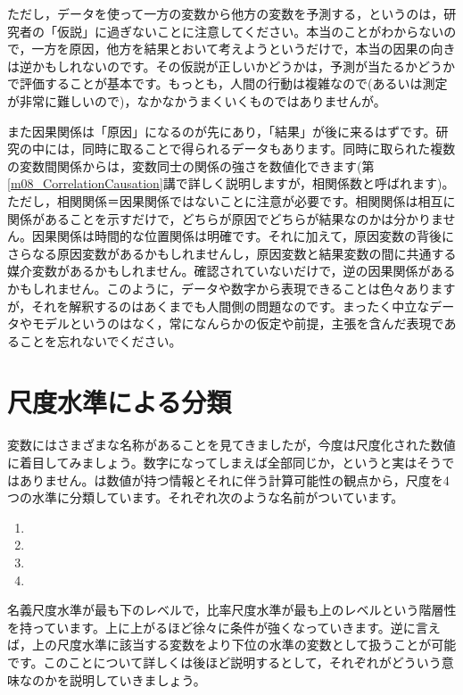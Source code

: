 \documentclass{ltjsbook}
\begin{document}
ただし，データを使って一方の変数から他方の変数を予測する，というのは，研究者の「仮説」に過ぎないことに注意してください。本当のことがわからないので，一方を原因，他方を結果とおいて考えようというだけで，本当の因果の向きは逆かもしれないのです。その仮説が正しいかどうかは，予測が当たるかどうかで評価することが基本です。もっとも，人間の行動は複雑なので(あるいは測定が非常に難しいので)，なかなかうまくいくものではありませんが。

また因果関係は「原因」になるのが先にあり，「結果」が後に来るはずです。研究の中には，同時に取ることで得られるデータもあります。同時に取られた複数の変数間関係からは，変数同士の関係の強さを数値化できます(第\ref{m08_CorrelationCausation}講で詳しく説明しますが，相関係数と呼ばれます)。ただし，相関関係＝因果関係ではないことに注意が必要です。相関関係は相互に関係があることを示すだけで，どちらが原因でどちらが結果なのかは分かりません。因果関係は時間的な位置関係は明確です。それに加えて，原因変数の背後にさらなる原因変数があるかもしれませんし，原因変数と結果変数の間に共通する媒介変数があるかもしれません。確認されていないだけで，逆の因果関係があるかもしれません。このように，データや数字から表現できることは色々ありますが，それを解釈するのはあくまでも人間側の問題なのです。まったく中立なデータやモデルというのはなく，常になんらかの仮定や前提，主張を含んだ表現であることを忘れないでください。


\section{尺度水準による分類}

変数にはさまざまな名称があることを見てきましたが，今度は尺度化された数値に着目してみましょう。数字になってしまえば全部同じか，というと実はそうではありません。\textcite{stevens1946}は数値が持つ情報とそれに伴う計算可能性の観点から，尺度を4つの水準に分類しています。それぞれ次のような名前がついています。
\begin{enumerate}
	\item {}
	\item {}
	\item {}
	\item {}
\end{enumerate}

名義尺度水準が最も下のレベルで，比率尺度水準が最も上のレベルという階層性を持っています。上に上がるほど徐々に条件が強くなっていきます。逆に言えば，上の尺度水準に該当する変数をより下位の水準の変数として扱うことが可能です。このことについて詳しくは後ほど説明するとして，それぞれがどういう意味なのかを説明していきましょう。
\end{document}
